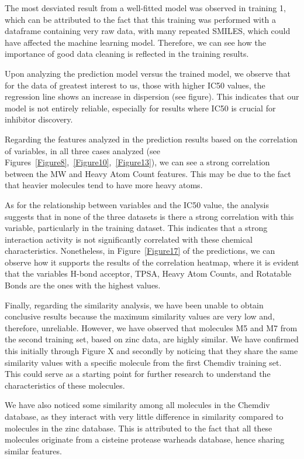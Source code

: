 \documentclass[final,times,twocolumn,article]{elsarticle}
\begin{document}
The most desviated result from a well-fitted model was observed in training 1, which can be attributed to the fact that this training was performed with a dataframe containing very raw data, with many repeated SMILES, which could have affected the machine learning model. Therefore, we can see how the importance of good data cleaning is reflected in the training results.

Upon analyzing the prediction model versus the trained model, we observe that for the data of greatest interest to us, those with higher IC50 values, the regression line shows an increase in dispersion (see figure). This indicates that our model is not entirely reliable, especially for results where IC50 is crucial for inhibitor discovery.

Regarding the features analyzed in the prediction results based on the correlation of variables, in all three cases analyzed (see Figures~\ref{Figure8},~\ref{Figure10},~\ref{Figure13}), we can see a strong correlation between the MW and Heavy Atom Count features. This may be due to the fact that heavier molecules tend to have more heavy atoms.

As for the relationship between variables and the IC50 value, the analysis suggests that in none of the three datasets is there a strong correlation with this variable, particularly in the training dataset. This indicates that a strong interaction activity is not significantly correlated with these chemical characteristics. Nonetheless, in Figure~\ref{Figure17} of the predictions, we can observe how it supports the results of the correlation heatmap, where it is evident that the variables H-bond acceptor, TPSA, Heavy Atom Counts, and Rotatable Bonds are the ones with the highest values.

Finally, regarding the similarity analysis, we have been unable to obtain conclusive results because the maximum similarity values are very low and, therefore, unreliable. However, we have observed that molecules M5 and M7 from the second training set, based on zinc data, are highly similar. We have confirmed this initially through Figure X and secondly by noticing that they share the same similarity values with a specific molecule from the first Chemdiv training set. This could serve as a starting point for further research to understand the characteristics of these molecules.

We have also noticed some similarity among all molecules in the Chemdiv database, as they interact with very little difference in similarity compared to molecules in the zinc database. This is attributed to the fact that all these molecules originate from a cisteine protease warheads database, hence sharing similar features.
\end{document}
